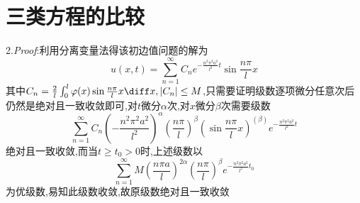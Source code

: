 \section{三类方程的比较}
2.\textit{Proof}:利用分离变量法得该初边值问题的解为
\[u(x,t)=\sum_{n=1}^{\infty}C_ne^{-\frac{n^2\pi^2a^2}{l^2}t}\sin\frac{n\pi}{l}x\]
其中$C_n=\frac{2}{l}\int_0^l\varphi(x)\sin\frac{n\pi}{l}x\diff x,|C_n|\leq M$,只需要证明级数逐项微分任意次后仍然是绝对且一致收敛即可,对$t$微分$\alpha$次,对$x$微分$\beta$次需要级数
\[\sum_{n=1}^{\infty}C_n\left(-\frac{n^2\pi^2a^2}{l^2}\right)^{\alpha}\left(\frac{n\pi}{l}\right)^{\beta}\left(\sin\frac{n\pi}{l}x\right)^{(\beta)}e^{-\frac{n^2\pi^2a^2}{l^2}t}\]
绝对且一致收敛,而当$t\geq t_0>0$时,上述级数以
\[\sum_{n=1}^{\infty}M\left(\frac{n\pi a}{l}\right)^{2\alpha}\left(\frac{n\pi}{l}\right)^{\beta}e^{-\frac{n^2\pi^2a^2}{l^2}t_0}\]
为优级数,易知此级数收敛,故原级数绝对且一致收敛
